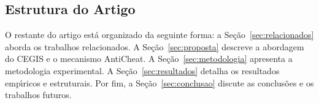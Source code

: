 \subsection*{Estrutura do Artigo}

O restante do artigo est\'{a} organizado da seguinte forma: a Se\c{c}\~{a}o~\ref{sec:relacionados} aborda os trabalhos relacionados. A Se\c{c}\~{a}o~\ref{sec:proposta} descreve a abordagem do CEGIS e o mecanismo AntiCheat. A Se\c{c}\~{a}o~\ref{sec:metodologia} apresenta a metodologia experimental. A Se\c{c}\~{a}o~\ref{sec:resultados} detalha os resultados emp\'{\i}ricos e estruturais. Por fim, a Se\c{c}\~{a}o~\ref{sec:conclusao} discute as conclus\~{o}es e os trabalhos futuros.

